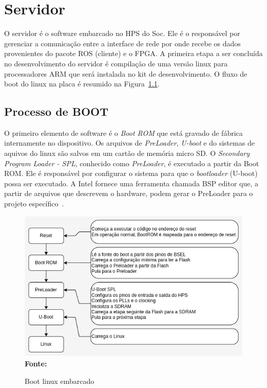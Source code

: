 \chapter{Servidor}

O servidor é o software embarcado no HPS do Soc. Ele é o responsável por gerenciar a comunicação entre a interface de rede por onde recebe os dados provenientes do pacote ROS (cliente) e o FPGA\@. A primeira etapa a ser concluída no desenvolvimento do servidor é compilação de uma versão linux para processadores ARM que será instalada no kit de desenvolvimento. O fluxo de boot do linux na placa é resumido na Figura~\ref{fig:linux}. 

\section{Processo de BOOT}
O primeiro elemento de software é o \textit{Boot ROM} que está gravado de fábrica internamente no dispositivo. Os arquivos de \textit{PreLoader},\textit{ U-boot} e do sistemas de aquivos do linux são salvos em um cartão de memória micro SD\@. O \textit{Secondary Program Loader - SPL}, conhecido como \textit{PreLoader}, é executado a partir da Boot ROM\@. Ele é responsável por configurar o sistema para que o \textit{bootloader} (U-boot) possa ser executado. A Intel fornece uma ferramenta chamada BSP editor que, a partir de arquivos que descrevem o hardware, podem gerar o PreLoader para o projeto específico~\cite{SocLinux}.  

\begin{figure}[ht]
	\caption{Boot linux embarcado}
	\begin{center}
		\includegraphics[scale=0.7]{imagens/embeddedLinux.png}\\
		{\small \textbf{Fonte:}\cite{SocLinux}}
    \end{center}\label{fig:linux}
\end{figure}

